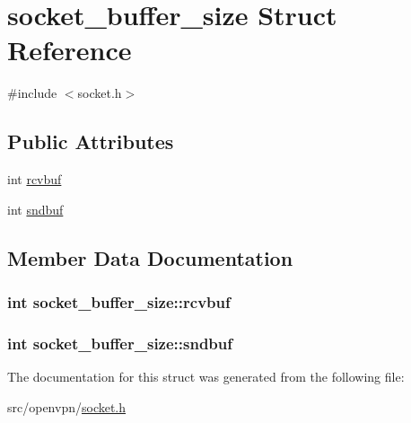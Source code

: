 \hypertarget{structsocket__buffer__size}{}\section{socket\+\_\+buffer\+\_\+size Struct Reference}
\label{structsocket__buffer__size}


{\ttfamily \#include $<$socket.\+h$>$}

\subsection*{Public Attributes}
\begin{DoxyCompactItemize}
\item 
int \hyperlink{structsocket__buffer__size_a4b0c56da832bddc882c2dddfb64a4280}{rcvbuf}
\item 
int \hyperlink{structsocket__buffer__size_a1ded24347f578b00a5aec4c98e19a6a7}{sndbuf}
\end{DoxyCompactItemize}


\subsection{Member Data Documentation}
\hypertarget{structsocket__buffer__size_a4b0c56da832bddc882c2dddfb64a4280}{}
\subsubsection[{rcvbuf}]{\setlength{\rightskip}{0pt plus 5cm}int socket\+\_\+buffer\+\_\+size\+::rcvbuf}\label{structsocket__buffer__size_a4b0c56da832bddc882c2dddfb64a4280}
\hypertarget{structsocket__buffer__size_a1ded24347f578b00a5aec4c98e19a6a7}{}
\subsubsection[{sndbuf}]{\setlength{\rightskip}{0pt plus 5cm}int socket\+\_\+buffer\+\_\+size\+::sndbuf}\label{structsocket__buffer__size_a1ded24347f578b00a5aec4c98e19a6a7}


The documentation for this struct was generated from the following file\+:\begin{DoxyCompactItemize}
\item 
src/openvpn/\hyperlink{socket_8h}{socket.\+h}\end{DoxyCompactItemize}
